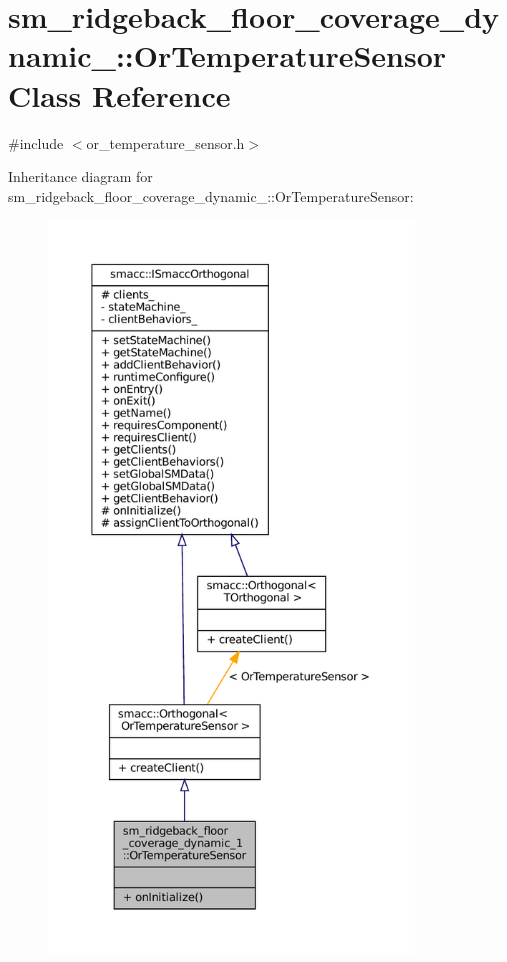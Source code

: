 \hypertarget{classsm__ridgeback__floor__coverage__dynamic__1_1_1OrTemperatureSensor}{}\section{sm\+\_\+ridgeback\+\_\+floor\+\_\+coverage\+\_\+dynamic\+\_\+:\+:Or\+Temperature\+Sensor Class Reference}
\label{classsm__ridgeback__floor__coverage__dynamic__1_1_1OrTemperatureSensor}


{\ttfamily \#include $<$or\+\_\+temperature\+\_\+sensor.\+h$>$}



Inheritance diagram for sm\+\_\+ridgeback\+\_\+floor\+\_\+coverage\+\_\+dynamic\+\_\+:\+:Or\+Temperature\+Sensor\+:
\nopagebreak
\begin{figure}[H]
\begin{center}
\leavevmode
\includegraphics[height=550pt]{classsm__ridgeback__floor__coverage__dynamic__1_1_1OrTemperatureSensor__inherit__graph}
\end{center}
\end{figure}


